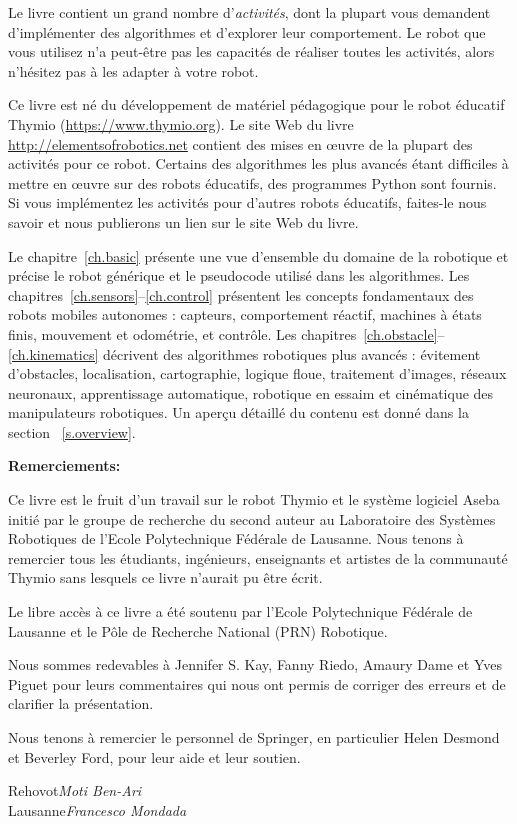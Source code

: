 Le livre contient un grand nombre d'\emph{activités}, dont la plupart vous demandent d'implémenter des algorithmes et d'explorer leur comportement. Le robot que vous utilisez n'a peut-être pas les capacités de réaliser toutes les activités, alors n'hésitez pas à les adapter à votre robot.

Ce livre est né du développement de matériel pédagogique pour le robot éducatif Thymio (\url{https://www.thymio.org}). Le site Web du livre \url{http://elementsofrobotics.net} contient des mises en œuvre de la plupart des activités pour ce robot. Certains des algorithmes les plus avancés étant difficiles à mettre en œuvre sur des robots éducatifs, des programmes Python sont fournis. Si vous implémentez les activités pour d'autres robots éducatifs, faites-le nous savoir et nous publierons un lien sur le site Web du livre.

Le chapitre~\ref{ch.basic} présente une vue d'ensemble du domaine de la robotique et précise le robot générique et le pseudocode utilisé dans les algorithmes. Les chapitres~\ref{ch.sensors}--\ref{ch.control} présentent les concepts fondamentaux des robots mobiles autonomes : capteurs, comportement réactif, machines à états finis, mouvement et odométrie, et contrôle. Les chapitres~\ref{ch.obstacle}--\ref{ch.kinematics} décrivent des algorithmes robotiques plus avancés : évitement d'obstacles, localisation, cartographie, logique floue, traitement d'images, réseaux neuronaux, apprentissage automatique, robotique en essaim et cinématique des manipulateurs robotiques. Un aperçu détaillé du contenu est donné dans la section ~\ref{s.overview}.

\bigskip

\noindent\textbf{Remerciements:}

Ce livre est le fruit d'un travail sur le robot Thymio et le système logiciel Aseba initié par le groupe de recherche du second auteur au Laboratoire des Systèmes Robotiques de l'Ecole Polytechnique Fédérale de Lausanne. Nous tenons à remercier tous les étudiants, ingénieurs, enseignants et artistes de la communauté Thymio sans lesquels ce livre n'aurait pu être écrit.

Le libre accès à ce livre a été soutenu par l'Ecole Polytechnique Fédérale de Lausanne et le Pôle de Recherche National (PRN) Robotique.

Nous sommes redevables à Jennifer S. Kay, Fanny Riedo, Amaury Dame et Yves Piguet pour leurs commentaires qui nous ont permis de corriger des erreurs et de clarifier la présentation.

Nous tenons à remercier le personnel de Springer, en particulier Helen Desmond et Beverley Ford, pour leur aide et leur soutien.

\bigskip

\begin{flushright}\noindent
Rehovot\hfill {\it Moti Ben-Ari}\\
Lausanne\hfill {\it Francesco Mondada}\\
\end{flushright}
 
\tableofcontents
